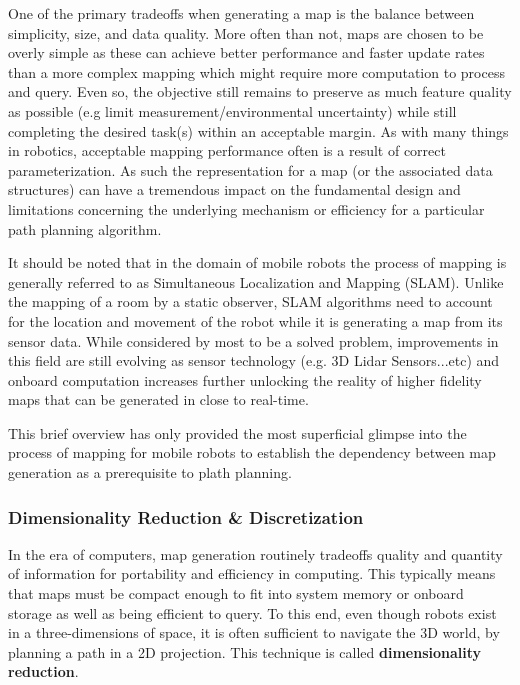 One of the primary tradeoffs when generating a map is the balance between simplicity, size, and data quality. More often than not, maps are chosen to be overly simple as these can achieve better performance and faster update rates than a more complex mapping which might require more computation to process and query. Even so, the objective still remains to preserve as much feature quality as possible (e.g limit measurement/environmental uncertainty) while still completing the desired task(s) within an acceptable margin. As with many things in robotics, acceptable mapping performance often is a result of correct parameterization. As such the representation for a map (or the associated data structures) can have a tremendous impact on the fundamental design and limitations concerning the underlying mechanism or efficiency for a particular path planning algorithm.

It should be noted that in the domain of mobile robots the process of mapping is generally referred to as Simultaneous Localization and Mapping (SLAM). Unlike the mapping of a room by a static observer, SLAM algorithms need to account for the location and movement of the robot while it is generating a map from its sensor data. While considered by most to be a solved problem, improvements in this field are still evolving as sensor technology (e.g. 3D Lidar Sensors...etc) and onboard computation increases further unlocking the reality of higher fidelity maps that can be generated in close to real-time. 


This brief overview has only provided the most superficial glimpse into the process of mapping for mobile robots to establish the dependency between map generation as a prerequisite to plath planning. 


\subsubsection{Dimensionality Reduction \& Discretization}

In the era of computers, map generation routinely tradeoffs quality and quantity of information for portability and efficiency in computing. This typically means that maps must be compact enough to fit into system memory or onboard storage as well as being efficient to query. To this end, even though robots exist in a three-dimensions of space, it is often sufficient to navigate the 3D world, by planning a path in a 2D projection. This technique is called \textbf{dimensionality reduction}. 

